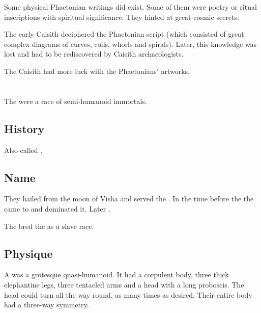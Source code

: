 Some physical Phaetonian writings did exist. 
Some of them were poetry or ritual inscriptions with spiritual significance.
They hinted at great cosmic secrets.

The early Caisith deciphered the Phaetonian script (which consisted of great complex diagrams of curves, coils, whorls and spirals). 
Later, this knowledge was lost and had to be rediscovered by Caisith archaeologists.

The Caisith had more luck with the Phaetonians' artworks. 

















\section[Shugul]{\Shugul}
\index{\shugul}
The \shuguls were a race of semi-humanoid immortals. 









\subsection{History}
Also called \quo{\moonthings}. 









\subsection{Name}
They hailed from the moon of Visha and served the \moongods.
In the time before the \ophidians the \shugul came to \Miith and dominated it.
Later . 

The \shugul bred the  as a slave race.









\subsection{Physique}
A \shugul was a grotesque quasi-humanoid.
It had a corpulent body, three thick elephantine legs, three tentacled arms and a head with a long proboscis.
The head could turn all the way round, as many times as desired.
Their entire body had a three-way symmetry.

